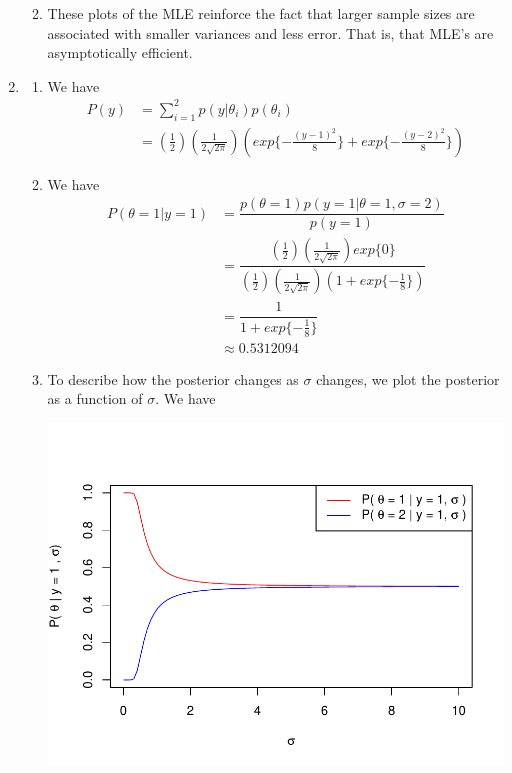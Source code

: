 \documentclass[12pt]{article}\usepackage[]{graphicx}\usepackage[]{color}
\makeatletter
\def\maxwidth{ %
  \ifdim\Gin@nat@width>\linewidth
    \linewidth
  \else
    \Gin@nat@width
  \fi
}
\newenvironment{knitrout}{}{} %
\makeatother
\begin{document}
\begin{enumerate}
\begin{enumerate}[label = (\alph*)]
\begin{knitrout}
{}



\end{knitrout}
\item These plots of the MLE reinforce the fact that larger sample sizes are associated with smaller variances and less error. That is, that MLE's are asymptotically efficient. 
\end{enumerate}
\item 
\begin{enumerate}[label = (\alph*)]
\item We have
\begin{align*}
P(y) &= \sum_{i = 1}^2 p(y | \theta_i) p(\theta_i)\\
&= (\frac{1}{2})(\frac{1}{2 \sqrt{2 \pi}}) ( exp \{ - \frac{(y - 1)^2}{8} \} +  exp \{ - \frac{(y - 2)^2}{8} \})
\end{align*}
\item We have
\begin{align*}
P( \theta = 1 | y =1) &= \dfrac{p( \theta = 1) p( y = 1 | \theta = 1, \sigma = 2)}{p(y = 1)}\\
&= \dfrac{(\frac{1}{2})(\frac{1}{2 \sqrt{2 \pi}}) exp \{ 0 \}}{(\frac{1}{2}) ( \frac{1}{2 \sqrt{2 \pi}})(1 + exp \{ - \frac{1}{8} \})}\\
&= \dfrac{1}{1 + exp \{ -\frac{1}{8} \} }\\
& \approx 0.5312094
\end{align*}
\item To describe how the posterior changes as $\sigma$ changes, we plot the posterior as a function of $\sigma$. We have

\begin{knitrout}
\color{fgcolor}

{\centering \includegraphics[width=\maxwidth]{figure/plot11c-1} 

}
\end{knitrout}
\end{enumerate}
\end{enumerate}
\end{document}
